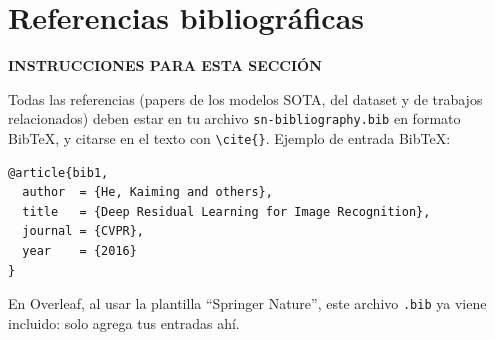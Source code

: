 \documentclass[pdflatex,sn-mathphys-num]{sn-jnl}
\newenvironment{instruccion}{%
  \par\noindent\textbf{\color{blue!55!black}INSTRUCCIONES PARA ESTA SECCIÓN}%
  \par\vspace{2pt}\noindent\itshape\small
}{%
  \par\normalfont\vspace{6pt}
}
\begin{document}
\section*{Referencias bibliográficas}

\begin{instruccion}
Todas las referencias (papers de los modelos SOTA, del dataset y de trabajos relacionados) deben estar en tu archivo \texttt{sn-bibliography.bib} en formato BibTeX, y citarse en el texto con \texttt{\textbackslash cite\{\}}. Ejemplo de entrada BibTeX:
\begin{verbatim}
@article{bib1,
  author  = {He, Kaiming and others},
  title   = {Deep Residual Learning for Image Recognition},
  journal = {CVPR},
  year    = {2016}
}
\end{verbatim}
En Overleaf, al usar la plantilla ``Springer Nature'', este archivo \texttt{.bib} ya viene incluido: solo agrega tus entradas ahí.
\end{instruccion}


\end{document}

